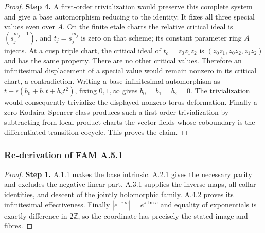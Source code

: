 \documentclass[11pt,a4paper]{article}
\theoremstyle{plain}
\theoremstyle{definition}
\begin{document}
\begin{proof}
\par\smallskip\noindent\textbf{Step 4.} A first-order trivialization would preserve this complete system and give a base automorphism reducing to the identity. It fixes all three special values even over $A$. On the finite etale charts the relative critical ideal is $(s_j^{m_j-1})$, and $t_j=s_j^{m_j}$ is zero on that scheme; its constant parameter ring $A$ injects. At a cusp triple chart, the critical ideal of $t_c=z_0z_1z_2$ is $(z_0z_1,z_0z_2,z_1z_2)$ and has the same property. There are no other critical values. Therefore an infinitesimal displacement of a special value would remain nonzero in its critical chart, a contradiction. Writing a base infinitesimal automorphism as $t+\epsilon(b_0+b_1t+b_2t^2)$, fixing $0,1,\infty$ gives $b_0=b_1=b_2=0$. The trivialization would consequently trivialize the displayed nonzero torus deformation. Finally a zero Kodaira--Spencer class produces such a first-order trivialization by subtracting from local product charts the vector fields whose coboundary is the differentiated transition cocycle. This proves the claim.
\end{proof}
\subsubsection{Re-derivation of FAM A.5.1}
\begin{proof}
\par\smallskip\noindent\textbf{Step 1.} A.1.1 makes the base intrinsic. A.2.1 gives the necessary parity and excludes the negative linear part. A.3.1 supplies the inverse maps, all collar identities, and descent of the jointly holomorphic family. A.4.2 proves its infinitesimal effectiveness. Finally $|e^{-\pi ic}|=e^{\pi\operatorname{Im}c}$ and equality of exponentials is exactly difference in $2\mathbb Z$, so the coordinate has precisely the stated image and fibres.
\end{proof}
\end{document}
